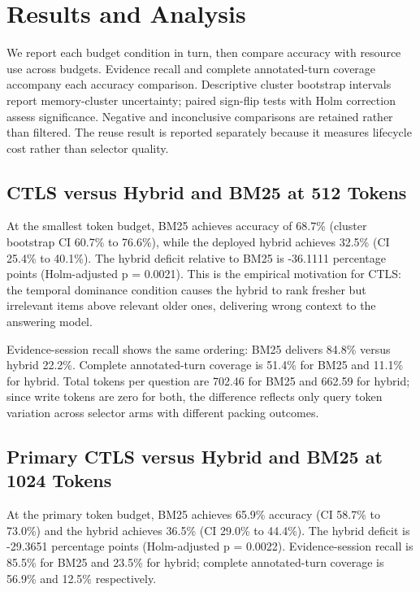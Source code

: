 \section{Results and Analysis}

\label{sec:results}

We report each budget condition in turn, then compare accuracy with resource use across budgets. Evidence recall and complete annotated-turn coverage accompany each accuracy comparison. Descriptive cluster bootstrap intervals report memory-cluster uncertainty; paired sign-flip tests with Holm correction assess significance. Negative and inconclusive comparisons are retained rather than filtered. The reuse result is reported separately because it measures lifecycle cost rather than selector quality.

\subsection{CTLS versus Hybrid and BM25 at 512 Tokens}

\label{sec:result_fair_baselines_512}

At the smallest token budget, BM25 achieves accuracy of 68.7\% (cluster bootstrap CI 60.7\% to 76.6\%), while the deployed hybrid achieves 32.5\% (CI 25.4\% to 40.1\%). The hybrid deficit relative to BM25 is -36.1111 percentage points (Holm-adjusted p = 0.0021). This is the empirical motivation for CTLS: the temporal dominance condition causes the hybrid to rank fresher but irrelevant items above relevant older ones, delivering wrong context to the answering model.

Evidence-session recall shows the same ordering: BM25 delivers 84.8\% versus hybrid 22.2\%. Complete annotated-turn coverage is 51.4\% for BM25 and 11.1\% for hybrid. Total tokens per question are 702.46 for BM25 and 662.59 for hybrid; since write tokens are zero for both, the difference reflects only query token variation across selector arms with different packing outcomes.

\subsection{Primary CTLS versus Hybrid and BM25 at 1024 Tokens}

\label{sec:result_fair_baselines}

At the primary token budget, BM25 achieves 65.9\% accuracy (CI 58.7\% to 73.0\%) and the hybrid achieves 36.5\% (CI 29.0\% to 44.4\%). The hybrid deficit is -29.3651 percentage points (Holm-adjusted p = 0.0022). Evidence-session recall is 85.5\% for BM25 and 23.5\% for hybrid; complete annotated-turn coverage is 56.9\% and 12.5\% respectively.

